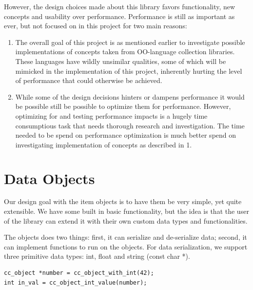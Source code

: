 \documentclass[table]{ituthesis}
\begin{document}
However, the design choices made about this library favors functionality, new concepts and usability over performance. Performance is still as important as ever, but not focused on in this project for two main reasons:

\begin{enumerate}
	\item The overall goal of this project is as mentioned earlier to investigate possible implementations of concepts taken from OO-language collection libraries. These languages have wildly unsimilar qualities, some of which will be mimicked in the implementation of this project, inherently hurting the level of performance that could otherwise be achieved.
	\item While some of the design decisions hinters or dampens performance it would be possible still be possible to optimize them for performance. However, optimizing for and testing performance impacts is a hugely time consumptious task that needs thorough research and investigation. The time needed to be spend on performance optimization is much better spend on investigating implementation of concepts as described in 1.
\end{enumerate}

\section{Data Objects}\label{sec:impl_data_objects}

Our design goal with the item objects is to have them be very simple, yet quite extensible. We have some built in basic functionality, but the idea is that the user of the library can extend it with their own custom data types and functionalities.

The objects does two things: first, it can serialize and de-serialize data; second, it can implement functions to run on the objects. For data serialization, we support three primitive data types: int, float and string (const char *).

\begin{lstlisting}[label=cc_object-serialization,caption=Example of how to serialize an int to and from a cc\_object]
cc_object *number = cc_object_with_int(42);
int in_val = cc_object_int_value(number);
\end{lstlisting}
	
\end{document}
